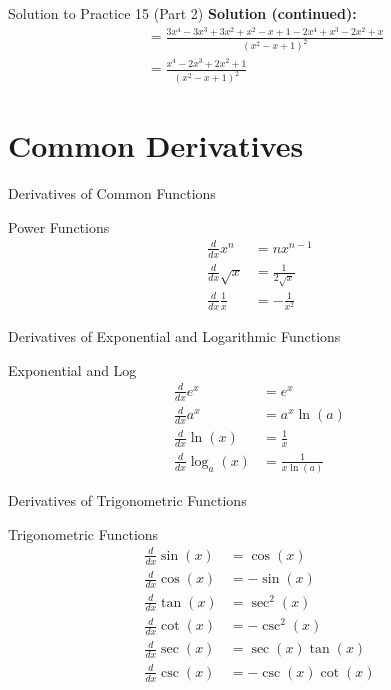 \documentclass[aspectratio=169]{beamer}
\begin{document}
\begin{frame}{Solution to Practice 15 (Part 2)}
\textbf{Solution (continued):}
\[
\begin{aligned}
  &= \frac{3x^4 - 3x^3 + 3x^2 + x^2 - x + 1 - 2x^4 + x^3 - 2x^2 + x}{(x^2 - x + 1)^2} \\
  &= \frac{x^4 - 2x^3 + 2x^2 + 1}{(x^2 - x + 1)^2}
\end{aligned}
\]
\end{frame}

\section{Common Derivatives}

\begin{frame}{Derivatives of Common Functions}
\begin{block}{Power Functions}
\[
\begin{aligned}
  \frac{d}{dx} x^n &= nx^{n-1} \\
  \frac{d}{dx} \sqrt{x} &= \frac{1}{2\sqrt{x}} \\
  \frac{d}{dx} \frac{1}{x} &= -\frac{1}{x^2}
\end{aligned}
\]
\end{block}
\end{frame}

\begin{frame}{Derivatives of Exponential and Logarithmic Functions}
\begin{block}{Exponential and Log}
\[
\begin{aligned}
  \frac{d}{dx} e^x &= e^x \\
  \frac{d}{dx} a^x &= a^x \ln(a) \\
  \frac{d}{dx} \ln(x) &= \frac{1}{x} \\
  \frac{d}{dx} \log_a(x) &= \frac{1}{x \ln(a)}
\end{aligned}
\]
\end{block}
\end{frame}

\begin{frame}{Derivatives of Trigonometric Functions}
\begin{block}{Trigonometric Functions}
\[
\begin{aligned}
  \frac{d}{dx} \sin(x) &= \cos(x) \\
  \frac{d}{dx} \cos(x) &= -\sin(x) \\
  \frac{d}{dx} \tan(x) &= \sec^2(x) \\
  \frac{d}{dx} \cot(x) &= -\csc^2(x) \\
  \frac{d}{dx} \sec(x) &= \sec(x)\tan(x) \\
  \frac{d}{dx} \csc(x) &= -\csc(x)\cot(x)
\end{aligned}
\]
\end{block}
\end{frame}
\end{document}
